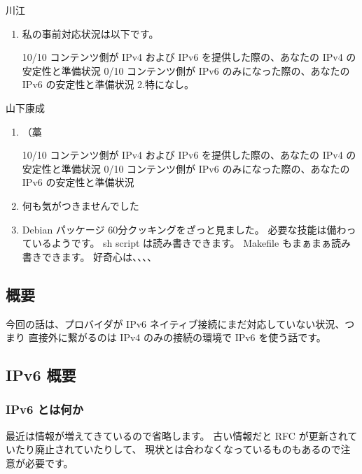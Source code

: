 \documentclass[mingoth,a4paper]{jsarticle}
\begin{document}
\begin{prework}{ 川江 }
  \begin{enumerate}
  \item 私の事前対応状況は以下です。
\begin{commandline}
10/10  コンテンツ側が IPv4 および IPv6 を提供した際の、あなたの IPv4 の安定性と準備状況
 0/10  コンテンツ側が IPv6 のみになった際の、あなたの IPv6 の安定性と準備状況
2.特になし。
\end{commandline}
  \end{enumerate}
\end{prework}

\begin{prework}{ 山下康成 }
  \begin{enumerate}
  \item （藁
\begin{commandline}
  10/10  コンテンツ側が IPv4 および IPv6 を提供した際の、あなたの IPv4 の安定性と準備状況
   0/10  コンテンツ側が IPv6 のみになった際の、あなたの IPv6 の安定性と準備状況
\end{commandline}
  \item 何も気がつきませんでした
  \item Debian パッケージ 60分クッキングをざっと見ました。
    必要な技能は備わっているようです。
    sh script は読み書きできます。
    Makefile もまぁまぁ読み書きできます。
    好奇心は、、、、
  \end{enumerate}
\end{prework}

\clearpage
\subsection{概要}

今回の話は、プロバイダが IPv6 ネイティブ接続にまだ対応していない状況、つまり
直接外に繋がるのは IPv4 のみの接続の環境で IPv6 を使う話です。
\subsection{IPv6 概要}

\subsubsection{IPv6 とは何か}


最近は情報が増えてきているので省略します。
古い情報だと RFC が更新されていたり廃止されていたりして、
現状とは合わなくなっているものもあるので注意が必要です。
\end{document}
